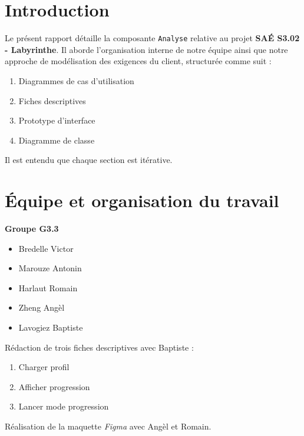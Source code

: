 \documentclass{butexFR}
\begin{document}
\fairepagedegarde
\fairemarges
\tabledematieres



\section{Introduction}

Le présent rapport détaille la composante \texttt{Analyse} relative au projet \textbf{SAÉ S3.02 - Labyrinthe}. Il aborde l'organisation interne de notre équipe ainsi que notre approche de modélisation des exigences du client, structurée comme suit :

\begin{enumerate}
    \item Diagrammes de cas d'utilisation
    \item Fiches descriptives
    \item Prototype d'interface
    \item Diagramme de classe
\end{enumerate}

Il est entendu que chaque section est itérative.

\section{Équipe et organisation du travail}
\textbf{Groupe G3.3}

\begin{itemize}
    \item Bredelle Victor
    \item Marouze Antonin
    \item Harlaut Romain
    \item Zheng Angèl
    \item Lavogiez Baptiste
\end{itemize}


Rédaction de trois fiches descriptives avec Baptiste :
\begin{enumerate}
    \item Charger profil
    \item Afficher progression
    \item Lancer mode progression
\end{enumerate}


Réalisation de la maquette \textit{Figma} avec %
Angèl et Romain.

\end{document}
